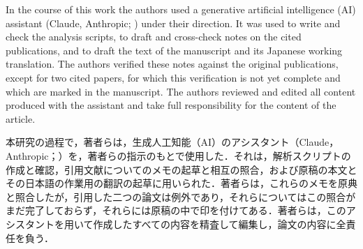 \begin{en}[B-5]
In the course of this work the authors used a generative artificial intelligence (AI) assistant (Claude, Anthropic; ) under their direction. It was used to write and check the analysis scripts, to draft and cross-check notes on the cited publications, and to draft the text of the manuscript and its Japanese working translation. The authors verified these notes against the original publications, except for two cited papers, for which this verification is not yet complete and which are marked in the manuscript. The authors reviewed and edited all content produced with the assistant and take full responsibility for the content of the article.
\end{en}
\begin{ja}
本研究の過程で，著者らは，生成人工知能（AI）のアシスタント（Claude，Anthropic；）を，著者らの指示のもとで使用した．それは，解析スクリプトの作成と確認，引用文献についてのメモの起草と相互の照合，および原稿の本文とその日本語の作業用の翻訳の起草に用いられた．著者らは，これらのメモを原典と照合したが，引用した二つの論文は例外であり，それらについてはこの照合がまだ完了しておらず，それらには原稿の中で印を付けてある．著者らは，このアシスタントを用いて作成したすべての内容を精査して編集し，論文の内容に全責任を負う．
\end{ja}


